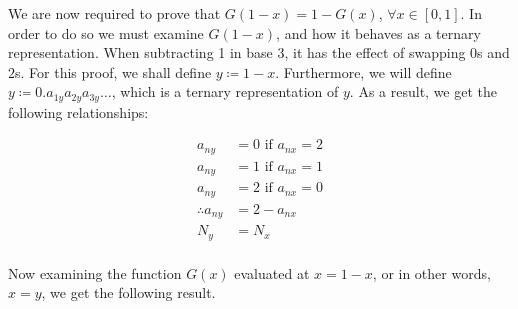 \documentclass[a4paper]{article}
\begin{document}
\begin{enumerate}[label=\textbf{\arabic*.}]
\begin{enumerate}
		We are now required to prove that $G(1-x) = 1 - G(x)$, $\forall x \in [0,1]$. In order to do so we must examine $G(1-x)$, and how it behaves as a ternary representation. When subtracting 1 in base 3, it has the effect of swapping $0$s and $2$s. For this proof, we shall define $y \coloneqq 1-x$. Furthermore, we will define $y \coloneqq 0.a_{1y}a_{2y}a_{3y}\dots$, which is a ternary representation of $y$. As a result, we get the following relationships:

		\begin{align*} 
		a_{ny} & = 0 \text{ if } a_{nx} = 2\\
		a_{ny} & = 1 \text{ if } a_{nx} = 1\\
		a_{ny} & = 2 \text{ if } a_{nx} = 0\\
		\therefore a_{ny} & = 2 - a_{nx}\\
		N_y & = N_x\\
		\end{align*}

		\pagebreak

		Now examining the function $G(x)$ evaluated at $x=1-x$, or in other words, $x = y$, we get the following result.


\end{enumerate}
\end{enumerate}
\end{document}
